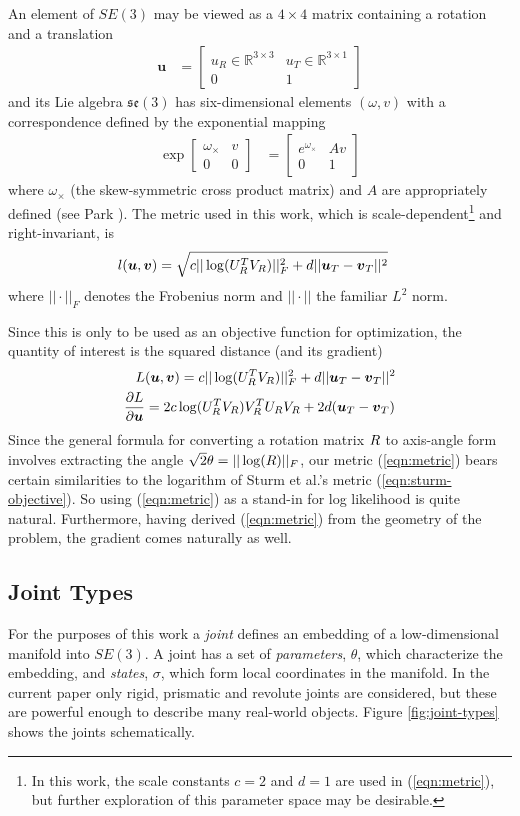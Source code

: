 \documentclass[a4paper,orivec]{llncs}
\newcommand\mat[2]{\ensuremath{\left[\begin{array}{#1}#2\end{array}\right]}}
\newcommand\deriv[2]{\ensuremath{\frac{\partial #1}{\partial #2}}}
\def\xmat{\uppercase}    \def\xmatstr{in uppercase}
\def\xvec{\vec}          \def\xvecstr{with an arrow}
\def\xse{\bm}            \def\xsestr{in boldface}
\begin{document}
An element of $SE(3)$ may be viewed as a $4 \times 4$ matrix containing a rotation and a translation
\begin{align}
  \xse{u} &= \mat{c|c}{ u_R \in \mathbb{R}^{3 \times 3} & u_T \in \mathbb{R}^{3 \times 1} \\\hline 0 & 1 }
\end{align}
and its Lie algebra $\mathfrak{se}(3)$ has six-dimensional elements $(\omega, v)$ with a correspondence defined by the exponential mapping
\begin{align}
  \exp{\mat{c|c}{ \omega_\times & v \\\hline 0 & 0 }} &= \mat{c|c}{ e^{\omega_\times} & Av \\\hline 0 & 1}
\end{align}
where $\omega_\times$ (the skew-symmetric cross product matrix) and $A$ are appropriately defined (see Park \cite{Park1995}). 
The metric used in this work, which is scale-dependent\footnote{In this work, the scale constants $c=2$ and $d=1$ are used in (\ref{eqn:metric}), but further exploration of this parameter space may be desirable.} and right-invariant, is
\begin{align}
  l&(\xse{u},\xse{v}) = \sqrt{c ||\log(\xmat{u}_R^T \xmat{v}_R)||_F^2 + d ||\xvec{u}_T - \xvec{v}_T||^2} \nonumber
\end{align}
where $||\cdot||_F$ denotes the Frobenius norm and $||\cdot||$ the familiar $L^2$ norm.

Since this is only to be used as an objective function for optimization, the quantity of interest is the squared distance (and its gradient)
\begin{align}
  L&(\xse{u},\xse{v}) = c ||\log(\xmat{u}_R^T \xmat{v}_R)||_F^2 + d ||\xvec{u}_T - \xvec{v}_T||^2 \label{eqn:metric} \\
  \deriv{L}{\xse{u}} &= 2c\log(\xmat{u}_R^T\xmat{v}_R)\xmat{v}_R^T\xmat{u}_R\xmat{v}_R + 2d(\xvec{u}_T-\xvec{v}_T)
\end{align}
Since the general formula for converting a rotation matrix $\xmat{r}$ to axis-angle form involves extracting the angle ${\sqrt{2}\theta = ||\log(\xmat{r})||_F}$, our metric (\ref{eqn:metric}) bears certain similarities to the logarithm of Sturm et al.'s metric (\ref{eqn:sturm-objective}). So using (\ref{eqn:metric}) as a stand-in for log likelihood is quite natural. Furthermore, having derived (\ref{eqn:metric}) from the geometry of the problem, the gradient comes naturally as well.

\subsection{Joint Types}\label{sec:joint-types}
For the purposes of this work a \emph{joint} defines an embedding of a low-dimensional manifold into $SE(3)$. A joint has a set of \emph{parameters}, $\theta$, which characterize the embedding, and \emph{states}, $\sigma$, which form local coordinates in the manifold. In the current paper only rigid, prismatic and revolute joints are considered, but these are powerful enough to describe many real-world objects. Figure \ref{fig:joint-types} shows the joints schematically.
\end{document}
